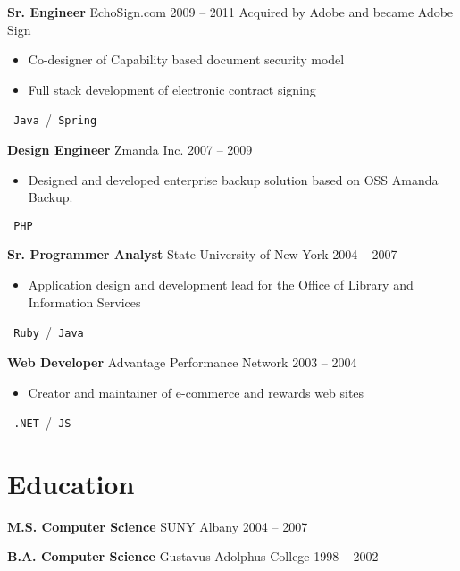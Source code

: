 \documentclass{res}
\begin{document}
        {\bf Sr. Engineer} \hfill EchoSign.com 2009 -- 2011
        Acquired by Adobe and became Adobe Sign
        \begin{itemize}
        \item Co-designer of Capability based document security model
        \item Full stack development of electronic contract signing
        \end{itemize}
	\texttt{ Java }\slash\texttt{ Spring }
        
        {\bf Design Engineer} \hfill Zmanda Inc. \hfill 2007 -- 2009
        \begin{itemize}
        \item Designed and developed enterprise backup solution based on OSS Amanda Backup.
        \end{itemize}
        \texttt{ PHP }
        
        {\bf Sr. Programmer Analyst} \hfill State University of New York \hfill 2004 -- 2007
        \begin{itemize}
        \item Application design and development lead for the Office of Library and Information Services
        \end{itemize}
        \texttt{ Ruby }\slash\texttt{ Java }
          
        {\bf Web Developer} \hfill Advantage Performance Network \hfill 2003 -- 2004
        \begin{itemize}
        \item Creator and maintainer of e-commerce and rewards web sites
        \end{itemize}
        \texttt{ .NET }\slash\texttt{ JS }
        

\section{Education}
        {\bf M.S. Computer Science} \hfill SUNY Albany \hfill 2004 -- 2007
        
        {\bf B.A. Computer Science} \hfill Gustavus Adolphus College \hfill 1998 -- 2002
        
        
\end{document}
